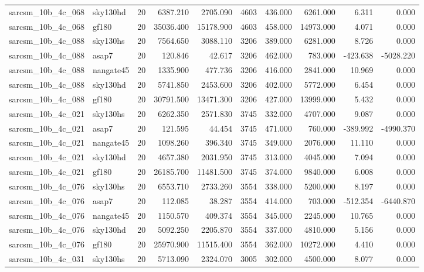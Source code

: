 \begin{tabular}{llrrrrrrrr}
sarcsm\_10b\_4c\_068 & sky130hd & 20 & 6387.210 & 2705.090 & 4603 & 436.000 & 6261.000 & 6.311 & 0.000 \\
sarcsm\_10b\_4c\_068 & gf180 & 20 & 35036.400 & 15178.900 & 4603 & 458.000 & 14973.000 & 4.071 & 0.000 \\
sarcsm\_10b\_4c\_088 & sky130hs & 20 & 7564.650 & 3088.110 & 3206 & 389.000 & 6281.000 & 8.726 & 0.000 \\
sarcsm\_10b\_4c\_088 & asap7 & 20 & 120.846 & 42.617 & 3206 & 462.000 & 783.000 & -423.638 & -5028.220 \\
sarcsm\_10b\_4c\_088 & nangate45 & 20 & 1335.900 & 477.736 & 3206 & 416.000 & 2841.000 & 10.969 & 0.000 \\
sarcsm\_10b\_4c\_088 & sky130hd & 20 & 5741.850 & 2453.600 & 3206 & 402.000 & 5772.000 & 6.454 & 0.000 \\
sarcsm\_10b\_4c\_088 & gf180 & 20 & 30791.500 & 13471.300 & 3206 & 427.000 & 13999.000 & 5.432 & 0.000 \\
sarcsm\_10b\_4c\_021 & sky130hs & 20 & 6262.350 & 2571.830 & 3745 & 332.000 & 4707.000 & 9.087 & 0.000 \\
sarcsm\_10b\_4c\_021 & asap7 & 20 & 121.595 & 44.454 & 3745 & 471.000 & 760.000 & -389.992 & -4990.370 \\
sarcsm\_10b\_4c\_021 & nangate45 & 20 & 1098.260 & 396.340 & 3745 & 349.000 & 2076.000 & 11.110 & 0.000 \\
sarcsm\_10b\_4c\_021 & sky130hd & 20 & 4657.380 & 2031.950 & 3745 & 313.000 & 4045.000 & 7.094 & 0.000 \\
sarcsm\_10b\_4c\_021 & gf180 & 20 & 26185.700 & 11481.500 & 3745 & 374.000 & 9840.000 & 6.008 & 0.000 \\
sarcsm\_10b\_4c\_076 & sky130hs & 20 & 6553.710 & 2733.260 & 3554 & 338.000 & 5200.000 & 8.197 & 0.000 \\
sarcsm\_10b\_4c\_076 & asap7 & 20 & 112.085 & 38.287 & 3554 & 414.000 & 703.000 & -512.354 & -6440.870 \\
sarcsm\_10b\_4c\_076 & nangate45 & 20 & 1150.570 & 409.374 & 3554 & 345.000 & 2245.000 & 10.765 & 0.000 \\
sarcsm\_10b\_4c\_076 & sky130hd & 20 & 5092.250 & 2205.870 & 3554 & 337.000 & 4810.000 & 5.156 & 0.000 \\
sarcsm\_10b\_4c\_076 & gf180 & 20 & 25970.900 & 11515.400 & 3554 & 362.000 & 10272.000 & 4.410 & 0.000 \\
sarcsm\_10b\_4c\_031 & sky130hs & 20 & 5713.090 & 2324.070 & 3005 & 302.000 & 4500.000 & 8.077 & 0.000 \\

\end{tabular}
